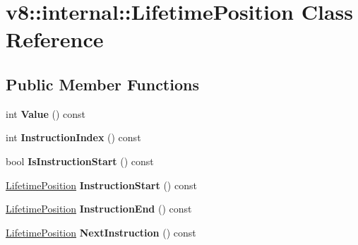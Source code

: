 \hypertarget{classv8_1_1internal_1_1_lifetime_position}{}\section{v8\+:\+:internal\+:\+:Lifetime\+Position Class Reference}
\label{classv8_1_1internal_1_1_lifetime_position}
\subsection*{Public Member Functions}
\begin{DoxyCompactItemize}
\item 
\hypertarget{classv8_1_1internal_1_1_lifetime_position_a571e7248741e5573f1025506e4aecb71}{}int {\bfseries Value} () const \label{classv8_1_1internal_1_1_lifetime_position_a571e7248741e5573f1025506e4aecb71}

\item 
\hypertarget{classv8_1_1internal_1_1_lifetime_position_a7a498629cbc7bc82839b310ec83c934e}{}int {\bfseries Instruction\+Index} () const \label{classv8_1_1internal_1_1_lifetime_position_a7a498629cbc7bc82839b310ec83c934e}

\item 
\hypertarget{classv8_1_1internal_1_1_lifetime_position_aa021cee120d284219295efceb21bc4fd}{}bool {\bfseries Is\+Instruction\+Start} () const \label{classv8_1_1internal_1_1_lifetime_position_aa021cee120d284219295efceb21bc4fd}

\item 
\hypertarget{classv8_1_1internal_1_1_lifetime_position_a3a03ef3e810f20e03c5293e9fd39fcc3}{}\hyperlink{classv8_1_1internal_1_1_lifetime_position}{Lifetime\+Position} {\bfseries Instruction\+Start} () const \label{classv8_1_1internal_1_1_lifetime_position_a3a03ef3e810f20e03c5293e9fd39fcc3}

\item 
\hypertarget{classv8_1_1internal_1_1_lifetime_position_a8bee4e68757da53c5b38e93dc86bb8e3}{}\hyperlink{classv8_1_1internal_1_1_lifetime_position}{Lifetime\+Position} {\bfseries Instruction\+End} () const \label{classv8_1_1internal_1_1_lifetime_position_a8bee4e68757da53c5b38e93dc86bb8e3}

\item 
\hypertarget{classv8_1_1internal_1_1_lifetime_position_a167e49987ca14bcf7d4f03ec0e2903e9}{}\hyperlink{classv8_1_1internal_1_1_lifetime_position}{Lifetime\+Position} {\bfseries Next\+Instruction} () const \label{classv8_1_1internal_1_1_lifetime_position_a167e49987ca14bcf7d4f03ec0e2903e9}


\end{DoxyCompactItemize}
